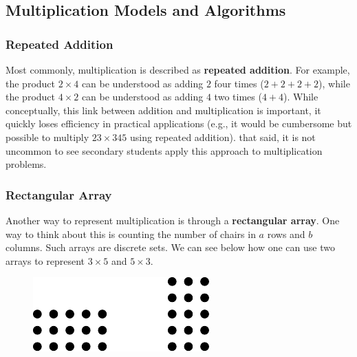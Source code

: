 \documentclass[
]{book}
\theoremstyle{definition}
\theoremstyle{definition}
\theoremstyle{definition}
\theoremstyle{definition}
\theoremstyle{remark}
\begin{document}
\hypertarget{multiplication-models-and-algorithms}{%
\subsection{Multiplication Models and Algorithms}\label{multiplication-models-and-algorithms}}

\hypertarget{repeated-addition}{%
\subsubsection*{Repeated Addition}\label{repeated-addition}}

Most commonly, multiplication is described as \textbf{repeated addition}. For example, the product \(2\times 4\) can be understood as adding \(2\) four times (\(2+2+2+2\)), while the product \(4\times 2\) can be understood as adding \(4\) two times (\(4+4\)). While conceptually, this link between addition and multiplication is important, it quickly loses efficiency in practical applications (e.g., it would be cumbersome but possible to multiply \(23\times 345\) using repeated addition). that said, it is not uncommon to see secondary students apply this approach to multiplication problems.

\hypertarget{rectangular-array}{%
\subsubsection*{Rectangular Array}\label{rectangular-array}}

Another way to represent multiplication is through a \textbf{rectangular array}. One way to think about this is counting the number of chairs in \(a\) rows and \(b\) columns. Such arrays are discrete sets. We can see below how one can use two arrays to represent \(3\times 5\) and \(5 \times 3\).

\begin{figure}

{\centering \includegraphics[width=0.5\linewidth]{tikz/arrays} 

}

\end{figure}
\end{document}
